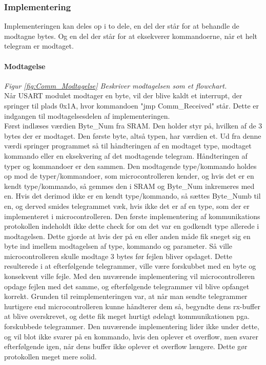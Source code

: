 \subsubsection{Implementering}
Implementeringen kan deles op i to dele, en del der står for at behandle de modtagne bytes. Og en del der står for at eksekverer kommandoerne, når et helt telegram er modtaget. 

\paragraph{Modtagelse}
\textit{Figur \ref{fig:Comm_Modtagelse} Beskriver modtagelsen som et flowchart.} \\

Når USART modulet modtager en byte, vil der blive kaldt et interrupt, der springer til plads 0x1A, hvor kommandoen "jmp Comm\_Received" står. Dette er indgangen til modtagelsesdelen af implementeringen. \\
Først indlæses værdien Byte\_Num fra SRAM. Den holder styr på, hvilken af de 3 bytes der er modtaget. Den første byte, altså typen, har værdien et. Ud fra denne værdi springer programmet så til håndteringen af en modtaget type, modtaget kommando eller en eksekvering af det modtagende telegram. Håndteringen af typer og kommandoer er den sammen. Den modtagende type/kommando holdes op mod de typer/kommandoer, som microcontrolleren kender, og hvis det er en kendt type/kommando, så gemmes den i SRAM og Byte\_Num inkremeres med en. Hvis det derimod ikke er en kendt type/kommando, så sættes Byte\_Numb til en, og derved smides telegrammet væk, hvis ikke det er af en type, som der er implementeret i microcontrolleren. Den første implementering af kommunikations protokollen indeholdt ikke dette check for om det var en godkendt type allerede i modtagelsen. Dette gjorde at hvis der på en eller anden måde fik sneget sig en byte ind imellem modtagelsen af type, kommando og parameter. Så ville microcontrolleren skulle modtage 3 bytes før fejlen bliver opdaget. Dette resulterede i at efterfølgende telegrammer, ville være forskubbet med en byte og konsekvent ville fejle. Med den nuværende implementering vil microcontrolleren opdage fejlen med det samme, og efterfølgende telegrammer vil blive opfanget korrekt. Grunden til reimplementeringen var, at når man sendte telegrammer hurtigere end microcontrolleren kunne håndterer dem så, begyndte dens rx-buffer at blive overskrevet, og dette fik meget hurtigt ødelagt kommunikationen pga. forskubbede telegrammer. Den nuværende implementering lider ikke under dette, og vil blot ikke svarer på en kommando, hvis den oplever et overflow, men svarer efterfølgende igen, når dens buffer ikke oplever et overflow længere. Dette gør protokollen meget mere solid.

